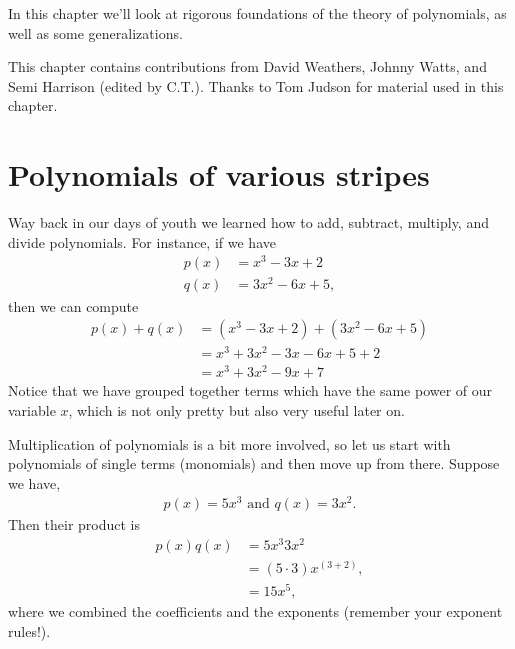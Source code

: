 

 
 In this chapter we'll look at rigorous foundations of the theory of polynomials, as well as some generalizations.
\bigskip

This chapter contains contributions from David Weathers, Johnny Watts, and Semi Harrison (edited by C.T.). Thanks to Tom Judson for material used in this chapter. 

\section{Polynomials of various stripes\quad
{}}
Way back in our days of youth we learned how to add, subtract, multiply, and divide polynomials.
For instance, if we have
\begin{align*} 
p(x) & = x^3 -3x +2 \\
q(x) & = 3x^2 -6x +5,
\end{align*}
then we can compute 
\begin{align*}
p(x) + q(x) 
& =  ( x^3 - 3 x + 2 ) + ( 3 x^2 - 6 x + 5 ) \\
& = x^3 + 3x^2 - 3x - 6x + 5 + 2\\
& = x^3 + 3 x^2 - 9 x + 7
\end{align*}
Notice that we have grouped together terms which have the same power of our variable $x$, which is not only pretty but also very useful later on.  

Multiplication of polynomials is a bit more involved, so let us start with polynomials of single terms (monomials) and then move up from there.  Suppose we have,
\begin{align*} 
p(x)  = 5x^3\text{ and }  
q(x)  = 3x^2.
\end{align*}
Then their product is
\begin{align*}
p(x)  q(x) 
& =  5x^3 3 x^2 \\
& = (5 \cdot 3)x^{(3 + 2)},\\
& = 15x^5,
\end{align*}
where we combined the coefficients and the exponents (remember your exponent rules!).  

